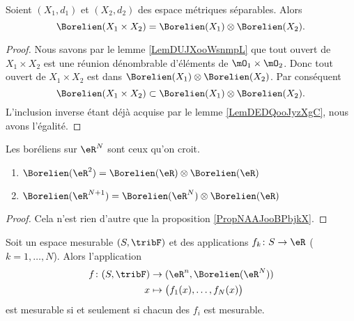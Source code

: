 \begin{proposition}        \label{PropNAAJooBPbjkX}
    Soient \( (X_1,d_1)\) et \( (X_2,d_2)\) des espace métriques séparables. Alors
    \begin{equation}
        \Borelien(X_1\times X_2)=\Borelien(X_1)\otimes \Borelien(X_2).
    \end{equation}
\end{proposition}

\begin{proof}
    Nous savons par le lemme \ref{LemDUJXooWsnmpL} que tout ouvert de \( X_1\times X_2\) est une réunion dénombrable d'éléments de \( \mO_1\times\mO_2\). Donc tout ouvert de \( X_1\times X_2\) est dans \( \Borelien(X_1)\otimes \Borelien(X_2)\). Par conséquent
    \begin{equation}
        \Borelien(X_1\times X_2)\subset \Borelien(X_1)\otimes \Borelien(X_2).
    \end{equation}
    L'inclusion inverse étant déjà acquise par le lemme \ref{LemDEDQooJyzXgC}, nous avons l'égalité.
\end{proof}

\begin{proposition}     \label{CorWOOOooHcoEEF}
    Les boréliens sur \( \eR^N\) sont ceux qu'on croit.
    \begin{enumerate}
        \item
            \( \Borelien(\eR^2)=\Borelien(\eR)\otimes \Borelien(\eR)\)
        \item
            \( \Borelien(\eR^{N+1})=\Borelien(\eR^N)\otimes \Borelien(\eR)\)
    \end{enumerate}
\end{proposition}

\begin{proof}
    Cela n'est rien d'autre que la proposition \ref{PropNAAJooBPbjkX}.
\end{proof}

\begin{proposition}
    Soit un espace mesurable \( (S,\tribF)\) et des applications \( f_k\colon S\to \eR\) (\( k=1,\ldots, N\)). Alors l'application
    \begin{equation}
        \begin{aligned}
            f\colon (S,\tribF)&\to (\eR^n,\Borelien(\eR^N)) \\
            x&\mapsto \big( f_1(x),\ldots, f_N(x) \big) 
        \end{aligned}
    \end{equation}
    est mesurable si et seulement si chacun des \( f_i\) est mesurable.
\end{proposition}

